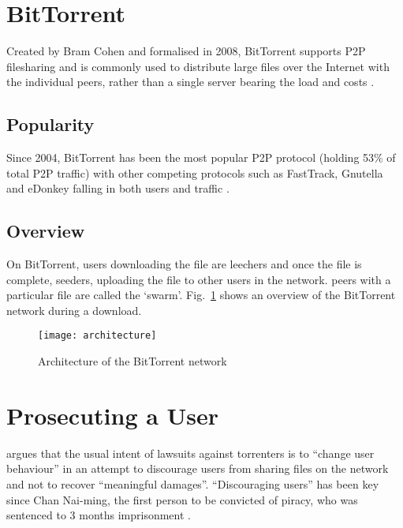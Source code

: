 \setcounter{table}{0}
\renewcommand{\thetable}{A\arabic{table}}

\begin{appendices}

\section{BitTorrent} \label{app:bittorrent}

Created by Bram Cohen and formalised in 2008, BitTorrent supports P2P filesharing and is commonly used to distribute large files over the Internet with the individual peers, rather than a single server bearing the load and costs \citep{cohen2008} . 

\subsection{Popularity}
Since 2004, BitTorrent has been the most popular P2P protocol (holding 53\% of total P2P traffic) with other competing  protocols such as FastTrack, Gnutella and eDonkey falling in both users and traffic \citep{cachelogictruep2p, cachelogicp2p2}.

\subsection{Overview} \label{app:torrentprocess}

On BitTorrent, users downloading the file are leechers and once the file is complete, seeders, uploading the file to other users in the network. \Glspl{peer} with a particular file are called the `swarm'. Fig.~\ref{fig:architecture} shows an overview of the BitTorrent network during a download.

\begin{figure}[h]
    \centering
    \texttt{[image: architecture]}
    \caption{Architecture of the BitTorrent network  \citet{history13}}
    \label{fig:architecture}
\end{figure}

\section{Prosecuting a User} \label{app:legaloptions}

\citet{MDE:MDE2634} argues that the usual intent of lawsuits against torrenters is to ``change user behaviour'' in an attempt to discourage users from sharing files on the network and not to recover ``meaningful damages''. ``Discouraging users'' has been key since Chan Nai-ming, the first person to be convicted of piracy, who was sentenced to 3 months imprisonment \citep{bigcrook07}.


\end{appendices}
